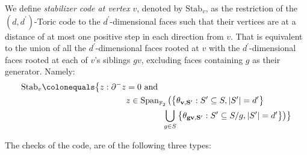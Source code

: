 \begin{definition}
  We define \textit{stabilizer code at vertex} $v$, denoted by $\text{Stab}_{v}$, as the restriction of the $(d,d^{\prime})$-Toric code to the $d^{\prime}$-dimensional faces such that their vertices are at a distance of at most one positive step in each direction from $v$. That is equivalent to the union of all the $d^{\prime}$-dimensional faces rooted at $v$ with the $d^{\prime}$-dimensional faces rooted at each of $v$'s siblings $gv$, excluding faces containing $g$ as their generator. Namely:
  \begin{align*}
    \text{Stab}_{v} \colonequals  \bigl\{ z : \partial^{-} z  &= 0 \text{ and } \\
    & z \in \operatorname{Span}_{\mathbb F_2} \big(  \big\{  \rotfvs{} : S^{\prime} \subseteq S, |S^{\prime}| = d^{\prime}  \big\} \\
   & \ \ \ \ \ \ \ \ \ \ \ \ \  \bigcup_{g \in S} \big\{ \rotfv{gv}{S^{\prime}} : S^{\prime} \subseteq S/g , |S^{\prime}|=d^{\prime} \big\} \big) \bigr\}
  \end{align*}
\end{definition}
The checks of the code, are of the following three types: 
